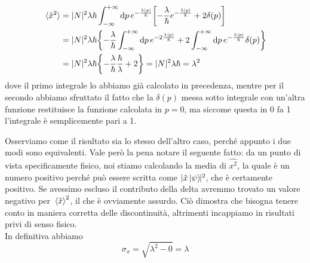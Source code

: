 \begin{soluzione}
\begin{itemize}[leftmargin=0.5cm]
\begin{equation*}
\begin{split}
         \expval*{\hat{x}^2}
         & =|N|^2 \lambda \hbar \int_{-\infty}^{+\infty} \dd{p} e^{-\frac{\lambda |p|}{\hbar}} \qty[ -\frac{\lambda}{\hbar} e^{-\frac{\lambda |p|}{\hbar}} + 2\delta(p) ]
         \\
         & =|N|^2 \lambda \hbar \qty{ -\frac{\lambda}{\hbar} \int_{-\infty}^{+\infty} \dd{p} e^{-2\frac{\lambda |p|}{\hbar}} + 2\int_{-\infty}^{+\infty} \dd{p} e^{-\frac{\lambda |p|}{\hbar}} \delta(p) }
         \\
         & =|N|^2 \lambda \hbar \qty{ -\frac{\lambda}{\hbar}\frac{\hbar}{\lambda} + 2 }
         =|N|^2 \lambda \hbar
         =\lambda^2
      \end{split}
   \end{equation*}
   dove il primo integrale lo abbiamo già calcolato in precedenza, mentre per il secondo abbiamo sfruttato il fatto che la $\delta(p)$ messa sotto integrale con un'altra funzione restituisce la funzione calcolata in $p=0$, ma siccome questa in 0 fa 1 l'integrale è semplicemente pari a 1.
   \end{itemize}
   Osserviamo come il risultato sia lo stesso dell'altro caso, perché appunto i due modi sono equivalenti. Vale però la pena notare il seguente fatto: da un punto di vista specificamente fisico, noi stiamo calcolando la media di $\hat{x^2}$, la quale è un numero positivo perché può essere scritta come $| \hat{x}\ket*{\psi} \hspace{-0.1cm} |^2$, che è certamente positivo. Se avessimo escluso il contributo della delta avremmo trovato un valore negativo per $\expval*{\hat{x}}^2$, il che è ovviamente assurdo. Ciò dimostra che bisogna tenere conto in maniera corretta delle discontinuità, altrimenti incappiamo in risultati privi di senso fisico.\\
   In definitiva abbiamo
   \begin{equation*}
      \sigma_x
      =\sqrt{\lambda^2 - 0}
      =\lambda
   \end{equation*}
\end{soluzione}

\newpage

